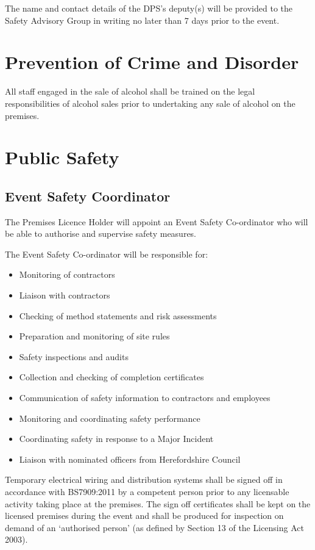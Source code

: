 The name and contact details of the DPS's deputy(s)
will be provided to the Safety Advisory Group in writing no later than 7
days prior to the event.

\section{Prevention of Crime and Disorder}

All staff engaged in the sale of alcohol shall be trained on the legal
responsibilities of alcohol sales prior to undertaking any sale of alcohol
on the premises.

\section{Public Safety}

\subsection{Event Safety Coordinator}

The Premises Licence Holder will appoint an Event Safety Co-ordinator
who will be able to authorise and supervise safety measures.

The Event Safety Co-ordinator will be responsible for:

\begin{itemize}
\tightlist
\item
  Monitoring of contractors
\item
  Liaison with contractors
\item
  Checking of method statements and risk assessments
\item
  Preparation and monitoring of site rules
\item
  Safety inspections and audits
\item
  Collection and checking of completion certificates
\item
  Communication of safety information to contractors and employees
\item
  Monitoring and coordinating safety performance
\item
  Coordinating safety in response to a Major Incident
\item
  Liaison with nominated officers from Herefordshire Council
\end{itemize}

Temporary electrical wiring and distribution systems shall be signed off
in accordance with BS7909:2011 by a competent person prior to any
licensable activity taking place at the premises. The sign off
certificates shall be kept on the licensed premises during the event and
shall be produced for inspection on demand of an `authorised person' (as
defined by Section 13 of the Licensing Act 2003).

